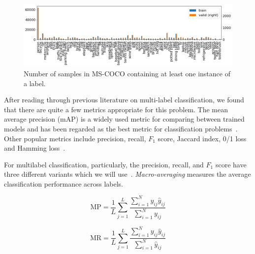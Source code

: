 \documentclass[12pt,journal,compsoc]{IEEEtran}
\begin{document}
\begin{figure}[!t]
\normalsize
\includegraphics[width=\linewidth]{mscoco_label_counts.png}
\caption{Number of samples in MS-COCO containing at least one instance of a label.}
\label{fig:coco_label_counts}
\vspace*{4pt}
\end{figure}



After reading through previous literature on multi-label classification, we found that there are quite a few metrics appropriate for this problem. The mean average precision (mAP) is a widely used metric for comparing between trained models and has been regarded as the best metric for classification problems~\cite{Lavrenko_2014}.  Other popular metrics include precision, recall, $F_1$ score, Jaccard index, 0/1 loss and Hamming loss~\cite{Tsoumakas:2007,SOKOLOVA2009427,Herrera:2016}. 

For multilabel classification, particularly, the precision, recall, and $F_1$ score have three different variants which we will use~\cite{MADJAROV20123084,WuZ16,Koyejo:2015,GongJLTI13}. \textit{Macro-averaging} measures the average classification performance across labels.  

\begin{equation}
\mathrm{MP} = \frac{1}{L}\sum_{j=1}^{L}\frac{\sum_{i=1}^{N}y_{ij}\hat{y}_{ij}}{\sum_{i=1}^{N}y_{ij}}
\label{eq:MP}
\end{equation}

\begin{equation}
\mathrm{MR} = \frac{1}{L}\sum_{j=1}^{L}\frac{\sum_{i=1}^{N}y_{ij}\hat{y}_{ij}}{\sum_{i=1}^{N}\hat{y}_{ij}}
\label{eq:MR}
\end{equation}
\end{document}
